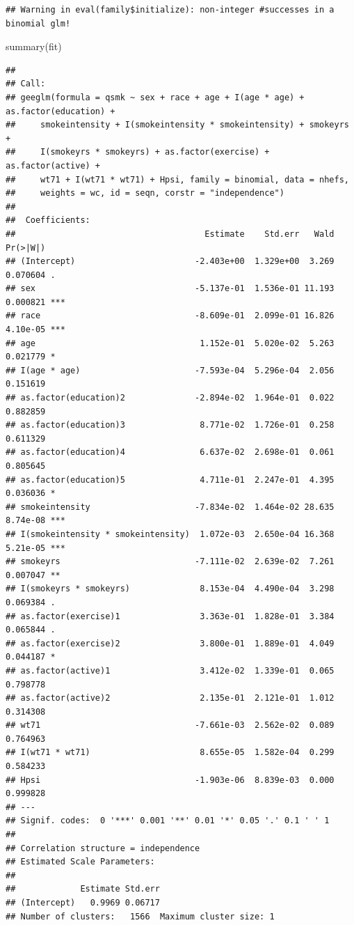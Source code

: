 \documentclass[
  10pt,
]{book}
\newenvironment{Shaded}{\begin{snugshade}}{\end{snugshade}}
\newcommand{\FunctionTok}[1]{\textcolor[rgb]{0.00,0.00,0.00}{#1}}
\newcommand{\NormalTok}[1]{#1}
\begin{document}
\begin{verbatim}
## Warning in eval(family$initialize): non-integer #successes in a binomial glm!
\end{verbatim}

\begin{Shaded}
\begin{Highlighting}[]
\FunctionTok{summary}\NormalTok{(fit)}
\end{Highlighting}
\end{Shaded}

\begin{verbatim}
## 
## Call:
## geeglm(formula = qsmk ~ sex + race + age + I(age * age) + as.factor(education) + 
##     smokeintensity + I(smokeintensity * smokeintensity) + smokeyrs + 
##     I(smokeyrs * smokeyrs) + as.factor(exercise) + as.factor(active) + 
##     wt71 + I(wt71 * wt71) + Hpsi, family = binomial, data = nhefs, 
##     weights = wc, id = seqn, corstr = "independence")
## 
##  Coefficients:
##                                      Estimate    Std.err   Wald Pr(>|W|)    
## (Intercept)                        -2.403e+00  1.329e+00  3.269 0.070604 .  
## sex                                -5.137e-01  1.536e-01 11.193 0.000821 ***
## race                               -8.609e-01  2.099e-01 16.826 4.10e-05 ***
## age                                 1.152e-01  5.020e-02  5.263 0.021779 *  
## I(age * age)                       -7.593e-04  5.296e-04  2.056 0.151619    
## as.factor(education)2              -2.894e-02  1.964e-01  0.022 0.882859    
## as.factor(education)3               8.771e-02  1.726e-01  0.258 0.611329    
## as.factor(education)4               6.637e-02  2.698e-01  0.061 0.805645    
## as.factor(education)5               4.711e-01  2.247e-01  4.395 0.036036 *  
## smokeintensity                     -7.834e-02  1.464e-02 28.635 8.74e-08 ***
## I(smokeintensity * smokeintensity)  1.072e-03  2.650e-04 16.368 5.21e-05 ***
## smokeyrs                           -7.111e-02  2.639e-02  7.261 0.007047 ** 
## I(smokeyrs * smokeyrs)              8.153e-04  4.490e-04  3.298 0.069384 .  
## as.factor(exercise)1                3.363e-01  1.828e-01  3.384 0.065844 .  
## as.factor(exercise)2                3.800e-01  1.889e-01  4.049 0.044187 *  
## as.factor(active)1                  3.412e-02  1.339e-01  0.065 0.798778    
## as.factor(active)2                  2.135e-01  2.121e-01  1.012 0.314308    
## wt71                               -7.661e-03  2.562e-02  0.089 0.764963    
## I(wt71 * wt71)                      8.655e-05  1.582e-04  0.299 0.584233    
## Hpsi                               -1.903e-06  8.839e-03  0.000 0.999828    
## ---
## Signif. codes:  0 '***' 0.001 '**' 0.01 '*' 0.05 '.' 0.1 ' ' 1
## 
## Correlation structure = independence 
## Estimated Scale Parameters:
## 
##             Estimate Std.err
## (Intercept)   0.9969 0.06717
## Number of clusters:   1566  Maximum cluster size: 1
\end{verbatim}
\end{document}
